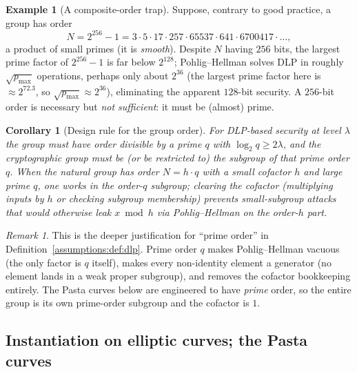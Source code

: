 \documentclass[11pt,a4paper]{article}
\newtheorem{corollary}[theorem]{Corollary}
\theoremstyle{definition}
\newtheorem{example}[theorem]{Example}
\theoremstyle{remark}
\newtheorem{remark}[theorem]{Remark}
\begin{document}
\begin{example}[A composite-order trap]
\label{assumptions:exa:smooth}
Suppose, contrary to good practice, a group has order
\[
N = 2^{256} - 1 = 3 \cdot 5 \cdot 17 \cdot 257 \cdot 65537 \cdot 641 \cdot 6700417 \cdot \dots,
\]
a product of small primes (it is \emph{smooth}). Despite \(N\) having \(256\) bits, the largest prime factor of \(2^{256}-1\) is far below \(2^{128}\); Pohlig--Hellman solves DLP in roughly \(\sqrt{p_{\max}}\) operations, perhaps only about \(2^{36}\) (the largest prime factor here is \(\approx 2^{72.3}\), so \(\sqrt{p_{\max}} \approx 2^{36}\)), eliminating the apparent \(128\)-bit security. A \(256\)-bit order is necessary but \emph{not sufficient}: it must be (almost) prime.
\end{example}

\begin{corollary}[Design rule for the group order]
\label{assumptions:cor:large-prime}
For DLP-based security at level \(\lambda\) the group must have order divisible by a prime \(q\) with \(\log_2 q \ge 2\lambda\), and the cryptographic group must be (or be restricted to) the subgroup of that prime order \(q\). When the natural group has order \(N = h\cdot q\) with a small \emph{cofactor} \(h\) and large prime \(q\), one works in the order-\(q\) subgroup; clearing the cofactor (multiplying inputs by \(h\) or checking subgroup membership) prevents small-subgroup attacks that would otherwise leak \(x \bmod h\) via Pohlig--Hellman on the order-\(h\) part.
\end{corollary}

\begin{remark}
\label{assumptions:rem:cofactor}
This is the deeper justification for ``prime order'' in Definition~\ref{assumptions:def:dlp}. Prime order \(q\) makes Pohlig--Hellman vacuous (the only factor is \(q\) itself), makes every non-identity element a generator (no element lands in a weak proper subgroup), and removes the cofactor bookkeeping entirely. The Pasta curves below are engineered to have \emph{prime} order, so the entire group is its own prime-order subgroup and the cofactor is \(1\).
\end{remark}

\subsection{Instantiation on elliptic curves; the Pasta curves}
\label{assumptions:subsec:pasta}
\end{document}
